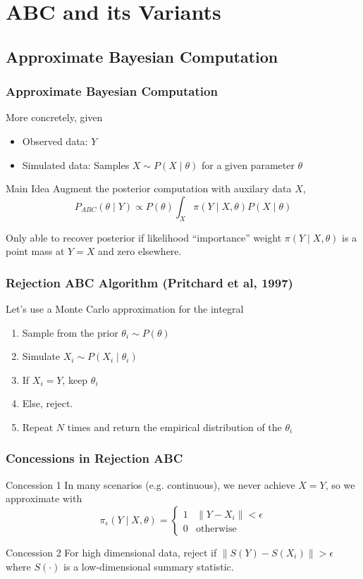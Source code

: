 \documentclass{beamer}
\begin{document}
\section{ABC and its Variants}
\subsection{Approximate Bayesian Computation}
\begin{frame}
\frametitle{Approximate Bayesian Computation}
More concretely, given
\begin{itemize}
\item Observed data: $Y$
\item Simulated data: Samples $X \sim P(X \mid \theta)$ for a given parameter $\theta$
\end{itemize}

\begin{block}{Main Idea}
Augment the posterior computation with auxilary data $X$,
$$P_{ABC}(\theta \mid Y) \propto P(\theta)\int_X \pi(Y \mid X, \theta) P(X \mid \theta)$$
\end{block}
Only able to recover posterior if likelihood ``importance'' weight $\pi(Y \mid X, \theta)$ is a point mass at $Y = X$ and zero elsewhere.
\end{frame}


\begin{frame}
\frametitle{Rejection ABC Algorithm (Pritchard et al, 1997)}
Let's use a Monte Carlo approximation for the integral
\begin{enumerate}
\item Sample from the prior $\theta_i \sim P(\theta)$
\item Simulate $X_i \sim P(X_i \mid \theta_i)$
\item If $X_i = Y$, keep $\theta_i$
\item Else, reject. 
\item Repeat $N$ times and return the empirical distribution of the $\theta_i$
\end{enumerate}
\end{frame}


\begin{frame}
\frametitle{Concessions in Rejection ABC}
\begin{block}{Concession 1}
In many scenarios (e.g. continuous), we never achieve $X = Y$, so we approximate with
\[
\pi_{\epsilon}(Y \mid X, \theta) = \begin{cases} 1 & \|Y - X_i\| < \epsilon \\ 
0 & \mbox{otherwise} \end{cases}
\]
\end{block}
\pause
\begin{block}{Concession 2}
For high dimensional data, reject if $\|S(Y) - S(X_i)\| > \epsilon$
where $S(\cdot)$ is a low-dimensional summary statistic.
\end{block}
\end{frame}
\end{document}
